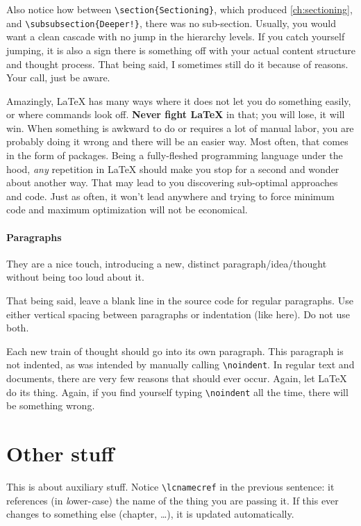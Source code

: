 Also notice how between \verb|\section{Sectioning}|, which produced \cref{ch:sectioning}, and \verb|\subsubsection{Deeper!}|, there was no sub-section.
Usually, you would want a clean cascade with no jump in the hierarchy levels.
If you catch yourself jumping, it is also a sign there is something off with your actual content structure and thought process.
That being said, I sometimes still do it because of reasons.
Your call, just be aware.

Amazingly, \LaTeX{} has many ways where it does not let you do something easily, or where commands look off.
\textbf{Never fight \LaTeX{}} in that; you will lose, it will win.
When something is awkward to do or requires a lot of manual labor, you are probably doing it wrong and there will be an easier way.
Most often, that comes in the form of packages.
Being a fully-fleshed programming language under the hood, \emph{any} repetition in \LaTeX{} should make you stop for a second and wonder about another way.
That may lead to you discovering sub-optimal approaches and code.
Just as often, it won't lead anywhere and trying to force minimum code and maximum optimization will not be economical.

\paragraph{Paragraphs}
They are a nice touch, introducing a new, distinct paragraph/idea/thought without being too loud about it.

That being said, leave a blank line in the source code for regular paragraphs.
Use either vertical spacing between paragraphs or indentation (like here).
Do not use both.

\noindent Each new train of thought should go into its own paragraph.
This paragraph is not indented, as was intended by manually calling \verb|\noindent|.
In regular text and documents, there are very few reasons that should ever occur.
Again, let \LaTeX{} do its thing.
Again, if you find yourself typing \verb|\noindent| all the time, there will be something wrong.

\section{Other stuff}\label{ch:other_stuff}
This \textcolor{mRed}{} is about auxiliary stuff.
Notice \color{mRed} \verb|\lcnamecref| \color{black} in the previous sentence: it references (in \textit{l}ower-\textit{c}ase) the name of the thing you are passing it.
If this  ever changes to something else (chapter, \dots), it is updated automatically.

